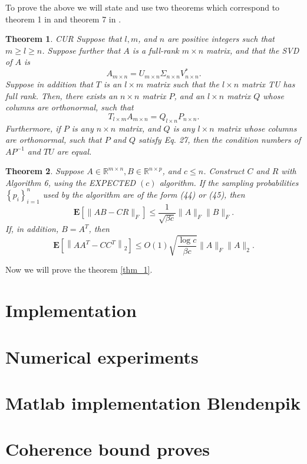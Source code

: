 \documentclass{article}
\newtheorem{theorem}{Theorem}
\begin{document}
To prove the above we will state and use two theorems which correspond to
theorem 1 in \cite{CUR} and theorem 7 in \cite{randalg}. 

\begin{theorem}{CUR} \label{thm_2}
Suppose that $l, m$, and $n$ are positive integers such that $m \geq l \geq n$.
Suppose further that $A$ is a full-rank $m \times n$ matrix, and that the SVD
of $A$ is
$$
A_{m \times n}=U_{m \times n} \Sigma_{n \times n} V_{n \times n}^{*} .
$$
Suppose in addition that $T$ is an $l \times m$ matrix such that the $l \times
n$ matrix TU has full rank.
Then, there exists an $n \times n$ matrix $P$, and an $l \times n$ matrix $Q$
whose columns are orthonormal, such that
$$
T_{l \times m} A_{m \times n}=Q_{l \times n} P_{n \times n} .
$$
Furthermore, if $P$ is any $n \times n$ matrix, and $Q$ is any $l \times n$
matrix whose columns are orthonormal, such that $P$ and $Q$ satisfy Eq. 27,
then the condition numbers of $A P^{-1}$ and $T U$ are equal.
\end{theorem}

\begin{theorem} \label{thm_3}
 Suppose $A \in \mathbb{R}^{m \times n}, B \in \mathbb{R}^{n \times p}$, and $c
 \leq n$. Construct $C$ and $R$ with Algorithm 6, using the EXPECTED $(c)$
 algorithm. If the sampling probabilities $\left\{p_{i}\right\}_{i=1}^{n}$ used
 by the algorithm are of the form (44) or (45), then
$$
\mathbf{E}\left[\|A B-C R\|_{F}\right] \leq \frac{1}{\sqrt{\beta c}}\|A\|_{F}\|B\|_{F} .
$$
If, in addition, $B=A^{T}$, then
$$
\mathbf{E}\left[\left\|A A^{T}-C C^{T}\right\|_{2}\right] \leq O(1) \sqrt{\frac{\log c}{\beta c}}\|A\|_{F}\|A\|_{2} .
$$
\end{theorem}

Now we will prove the theorem \ref{thm_1}. 

\section{Implementation} \label{impl}

\section{Numerical experiments} \label{num_exp}

 


\appendix
\section{Matlab implementation Blendenpik} \label{app_code}
\section{Coherence bound proves} \label{app_coh}
\end{document}

